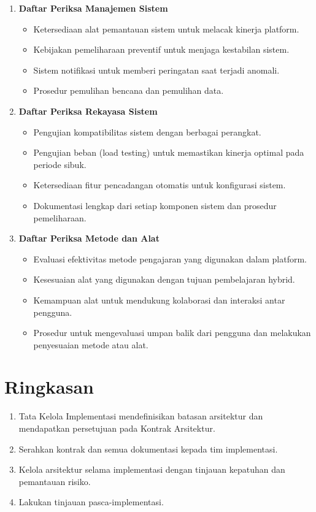 \begin{enumerate}
\begin{enumerate}
		\item \textbf{Daftar Periksa Manajemen Sistem} 
		\begin{itemize}
			\item Ketersediaan alat pemantauan sistem untuk melacak kinerja platform.
			\item Kebijakan pemeliharaan preventif untuk menjaga kestabilan sistem.
			\item Sistem notifikasi untuk memberi peringatan saat terjadi anomali.
			\item Prosedur pemulihan bencana dan pemulihan data.
		\end{itemize}
		
		\item \textbf{Daftar Periksa Rekayasa Sistem} 
		\begin{itemize}
			\item Pengujian kompatibilitas sistem dengan berbagai perangkat.
			\item Pengujian beban (load testing) untuk memastikan kinerja optimal pada periode sibuk.
			\item Ketersediaan fitur pencadangan otomatis untuk konfigurasi sistem.
			\item Dokumentasi lengkap dari setiap komponen sistem dan prosedur pemeliharaan.
		\end{itemize}
		
		\item \textbf{Daftar Periksa Metode dan Alat} 
		\begin{itemize}
			\item Evaluasi efektivitas metode pengajaran yang digunakan dalam platform.
			\item Kesesuaian alat yang digunakan dengan tujuan pembelajaran hybrid.
			\item Kemampuan alat untuk mendukung kolaborasi dan interaksi antar pengguna.
			\item Prosedur untuk mengevaluasi umpan balik dari pengguna dan melakukan penyesuaian metode atau alat.
		\end{itemize}
	\end{enumerate}
	
\end{enumerate}


\section{Ringkasan}
\begin{enumerate}
	\item Tata Kelola Implementasi mendefinisikan batasan arsitektur dan mendapatkan persetujuan pada Kontrak Arsitektur.
	\item Serahkan kontrak dan semua dokumentasi kepada tim implementasi.
	\item Kelola arsitektur selama implementasi dengan tinjauan kepatuhan dan pemantauan risiko.
	\item Lakukan tinjauan pasca-implementasi.
\end{enumerate}

